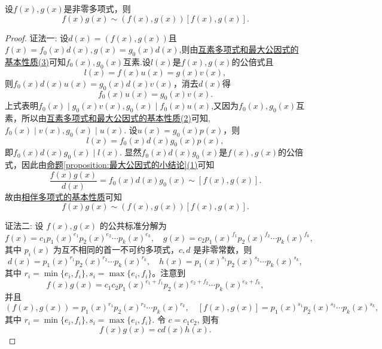 \documentclass[../../main.tex]{subfiles}%
\begin{document}
\begin{proposition}[两个多项式的乘积与其最大公因式和最小公倍式的乘积相伴]\label{proposition:两个多项式的乘积与其最大公因式和最小公倍式的乘积相伴}
设\(f(x),g(x)\)是非零多项式，则
\[
f(x)g(x)\sim(f(x),g(x))[f(x),g(x)].
\]
\end{proposition}
\begin{proof}

{\color{blue}证法一:}
设\(d(x)=(f(x),g(x))\)且\(f(x)=f_0(x)d(x),g(x)=g_0(x)d(x)\),则由\hyperref[proposition:互素多项式和最大公因式的基本性质]{互素多项式和最大公因式的基本性质(3)}可知\(f_0(x),g_0(x)\)互素.设\(l(x)\)是\(f(x),g(x)\)的公倍式且
\[
l(x)=f(x)u(x)=g(x)v(x),
\]
则\(f_0(x)d(x)u(x)=g_0(x)d(x)v(x)\)，消去\(d(x)\)得
\[
f_0(x)u(x)=g_0(x)v(x).
\]
上式表明$f_0(x)\mid g_0(x)v(x),g_0(x)\mid f_0(x)u(x)$,又因为\(f_0(x),g_0(x)\)互素，所以由\hyperref[proposition:互素多项式和最大公因式的基本性质]{互素多项式和最大公因式的基本性质(2)}可知,\(f_0(x)\mid v(x),g_0(x)\mid u(x)\). 设\(u(x)=g_0(x)p(x)\)，则
\[
l(x)=f_0(x)d(x)g_0(x)p(x),
\]
即\(f_0(x)d(x)g_0(x)\mid l(x)\). 显然\(f_0(x)d(x)g_0(x)\)是\(f(x),g(x)\)的公倍式，因此由\hyperref[proposition:最大公因式的小结论]{命题\ref{proposition:最大公因式的小结论}(1)}可知
\[
\frac{f(x)g(x)}{d(x)}=f_0(x)d(x)g_0(x)\sim[f(x),g(x)].
\]
故由\hyperref[proposition:相伴多项式的基本性质]{相伴多项式的基本性质}可知
\[
f(x)g(x)\sim(f(x),g(x))[f(x),g(x)].
\]

{\color{blue}证法二:}
设 \(f(x), g(x)\) 的公共标准分解为
\[
f(x) = c_1 p_1(x)^{e_1}p_2(x)^{e_2} \cdots p_k(x)^{e_k}, \quad g(x) = c_2 p_1(x)^{f_1}p_2(x)^{f_2} \cdots p_k(x)^{f_k},
\]
其中 \(p_i(x)\) 为互不相同的首一不可约多项式，\(c, d\) 是非零常数，则
\[
d(x) = p_1(x)^{r_1}p_2(x)^{r_2} \cdots p_k(x)^{r_k}, \quad h(x) = p_1(x)^{s_1}p_2(x)^{s_2} \cdots p_k(x)^{s_k},
\]
其中 \(r_i = \min\{e_i, f_i\}, s_i = \max\{e_i, f_i\}\)。注意到
\[
f(x)g(x) = c_1c_2 p_1(x)^{e_1 + f_1}p_2(x)^{e_2 + f_2} \cdots p_k(x)^{e_k + f_k},
\]
并且
\[
(f(x), g(x)) = p_1(x)^{r_1}p_2(x)^{r_2} \cdots p_k(x)^{r_k}, \quad [f(x), g(x)] = p_1(x)^{s_1}p_2(x)^{s_2} \cdots p_k(x)^{s_k},
\]
其中 \(r_i = \min\{e_i, f_i\}, s_i = \max\{e_i, f_i\}\). 令 \(c = c_1c_2\), 则有
\[
f(x)g(x) = cd(x)h(x).
\]
\end{proof}
\end{document}
